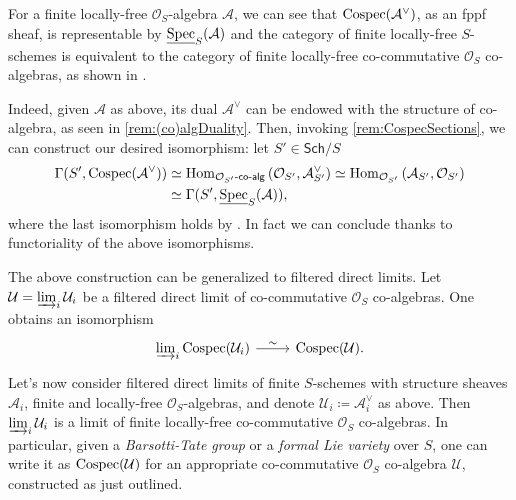 \begin{rem}[]
	For a finite locally-free $\mathcal{O}_{ S }$-algebra $\mathcal{A}$,
	we can see that $\operatorname{Cospec}(\mathcal{A}^{\vee})$, as an fppf sheaf, is representable 
	by $\underline{\operatorname{Spec}}_S(\mathcal{A})$ and
	the category of finite locally-free $S$-schemes
	is equivalent to the category of finite locally-free co-commutative
	$\mathcal{O}_{ S }$ co-algebras, as shown in 
	\cite[Chapter III, remark 2.1.2]{Messing}.

	Indeed, given $\mathcal{A}$ as above, its dual
	$\mathcal{A}^{\vee}$ can be endowed with the structure of co-algebra, 
	as seen in \cref{rem:(co)algDuality}.
	Then, invoking \cref{rem:CospecSections}, we can construct 
	our desired isomorphism: let $S' \in \mathsf{Sch}/S$
	\begin{align*}
		\Gamma(S', \operatorname{Cospec}(\mathcal{A}^{\vee})) &\simeq
		\operatorname{Hom}_{ \mathcal{O}_{ S' }\text{-}\mathsf{co}\text{-}\mathsf{alg}} 
		\left( \mathcal{O}_{ S' }, \mathcal{A}^\vee_{S'} \right) \simeq
		\operatorname{Hom}_{ \mathcal{O}_{ S' }}
		\left( \mathcal{A}_{S'}, \mathcal{O}_{ S' } \right) \\
		&\simeq
		\Gamma(S', \underline{\operatorname{Spec}}_S(\mathcal{A}))
	,\end{align*}
	where the last isomorphism holds by 
	\cite[\href{https://stacks.math.columbia.edu/tag/01LV}{Lemma 01LV}]{SP}.
	In fact we can conclude thanks to functoriality of the above isomorphisms.
\end{rem}


\begin{rem}
	The above construction can be generalized to
	filtered direct limits.
	Let $\mathcal{U} = \varinjlim_i \mathcal{U}_i$ be a filtered direct limit
	of co-commutative \(\mathcal{O}_{ S }\) co-algebras.
	One obtains an isomorphism
	\begin{equation*}
	\begin{tikzcd}[row sep = 0ex
		,/tikz/column 1/.append style={anchor=base east}
		,/tikz/column 2/.append style={anchor=base west}]
		\varinjlim_i \cospec(\mathcal{U}_i) \arrow[r, "\sim", rightarrow] &
		\cospec(\mathcal{U})
	.\end{tikzcd}
	\end{equation*} 
	Let's now consider filtered direct limits of 
	finite $S$-schemes with structure sheaves $\mathcal{A}_i$,
	finite and locally-free $\mathcal{O}_{ S }$-algebras, 
	and denote $\mathcal{U}_i \coloneqq \mathcal{A}_i^\vee$ as above.
	Then $\varinjlim_i \mathcal{U}_i$ is a limit 
	of finite locally-free co-commutative $\mathcal{O}_{ S }$ co-algebras.
	In particular, given a \emph{Barsotti-Tate group} or a \emph{formal Lie variety}
	over $S$, one can write it as $\operatorname{Cospec}(\mathcal{U})$ for an appropriate 
	co-commutative $\mathcal{O}_{ S }$ co-algebra $\mathcal{U}$, constructed as just outlined.
\end{rem}


